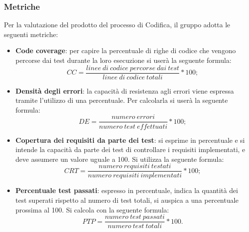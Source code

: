 \subsubsection{Metriche}
Per la valutazione del prodotto del processo di Codifica, il gruppo adotta le seguenti metriche:
\begin{itemize}
	\item \textbf{Code coverage}: per capire la percentuale di righe di codice che vengono percorse dai test durante la loro esecuzione si userà la seguente formula:
\[CC=\frac{linee \ di \ codice \ percorse \ dai \ test}{linee \ di \ codice \ totali}*100;\]
	\item \textbf{Densità degli errori}: la capacità di resistenza agli errori viene espressa tramite l'utilizzo di una percentuale. Per calcolarla si userà la seguente formula:
\[DE=\frac{numero \ errori}{numero \ test \ effettuati}*100;\]



	\item \textbf{Copertura dei requisiti da parte dei test}: si esprime in percentuale e si intende la capacità da parte dei test di controllare i requisiti implementati, e deve assumere un valore uguale a 100. Si utilizza la seguente formula:
	\[CRT=\frac{numero \ requisiti \ testati}{numero \ requisiti \ implementati}*100;\]
	\item \textbf{Percentuale test passati}: espresso in percentuale, indica la quantità dei test superati rispetto al numero di test totali, si auspica a una percentuale prossima al 100. Si calcola con la seguente formula:
	\[PTP=\frac{numero \ test \ passati}{numero \ test \ totali}*100.\]
\end{itemize}
 